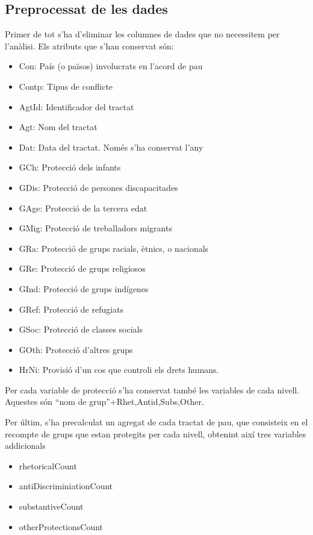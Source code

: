 \documentclass{article}
\begin{document}
\subsection{Preprocessat de les dades}
Primer de tot s'ha d'eliminar les columnes de dades que no necessitem per l'anàlisi.
Els atributs que s'han conservat són:
\begin{itemize}
    \item Con: País (o països) involucrats en l'acord de pau
    \item Contp: Tipus de conflicte
    \item AgtId: Identificador del tractat
    \item Agt: Nom del tractat
    \item Dat: Data del tractat. Només s'ha conservat l'any
    \item GCh: Protecció dels infants
    \item GDis: Protecció de persones discapacitades
    \item GAge: Protecció de la tercera edat
    \item GMig: Protecció de treballadors migrants
    \item GRa: Protecció de grups racials, ètnics, o nacionals
    \item GRe: Protecció de grups religiosos
    \item GInd: Protecció de grups indígenes
    \item GRef: Protecció de refugiats
    \item GSoc: Protecció de classes socials
    \item GOth: Protecció d'altres grups
    \item HrNi: Provisió d'un cos que controli els drets humans.
\end{itemize}

Per cada variable de protecció s'ha conservat també les variables de cada nivell.
Aquestes són ``nom de grup''+{Rhet,Antid,Subs,Other}.

Per últim, s'ha precalculat un agregat de cada tractat de pau, que consisteix en el
recompte de grups que estan protegits per cada nivell, obtenint així tres variables
addicionals
\begin{itemize}
    \item rhetoricalCount
    \item antiDiscriminiationCount
    \item substantiveCount
    \item otherProtectionsCount
\end{itemize}
\end{document}
